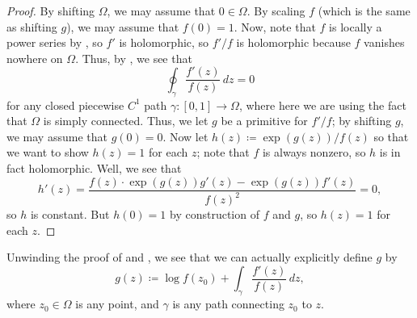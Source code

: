 \documentclass[notes.tex]{subfiles}
\begin{document}
\begin{proof}
	By shifting $\Omega$, we may assume that $0\in\Omega$. By scaling $f$ (which is the same as shifting $g$), we may assume that $f(0)=1$. Now, note that $f$ is locally a power series by , so $f'$ is holomorphic, so $f'/f$ is holomorphic because $f$ vanishes nowhere on $\Omega$. Thus, by , we see that
	\[\oint_\gamma\frac{f'(z)}{f(z)}\,dz=0\]
	for any closed piecewise $C^1$ path $\gamma\colon[0,1]\to\Omega$, where here we are using the fact that $\Omega$ is simply connected. Thus, we let $g$ be a primitive for $f'/f$; by shifting $g$, we may assume that $g(0)=0$. Now let $h(z)\coloneqq\exp(g(z))/f(z)$ so that we want to show $h(z)=1$ for each $z$; note that $f$ is always nonzero, so $h$ is in fact holomorphic. Well, we see that
	\[h'(z)=\frac{f(z)\cdot\exp(g(z))g'(z)-\exp(g(z))f'(z)}{f(z)^2}=0,\]
	so $h$ is constant. But $h(0)=1$ by construction of $f$ and $g$, so $h(z)=1$ for each $z$.
\end{proof}
\begin{remark} \label{rem:explicit-log}
	Unwinding the proof of  and , we see that we can actually explicitly define $g$ by
	\[g(z)\coloneqq\log f(z_0)+\int_\gamma\frac{f'(z)}{f(z)}\,dz,\]
	where $z_0\in\Omega$ is any point, and $\gamma$ is any path connecting $z_0$ to $z$.
\end{remark}
\end{document}
